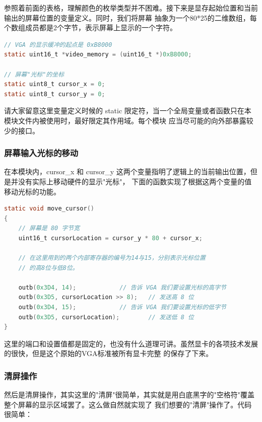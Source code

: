 \par 参照着前面的表格，理解颜色的枚举类型并不困难。接下来是显存起始位置和当前输出的屏幕位置的变量定义。同时，我们将屏幕\allowbreak
抽象为一个80*25的二维数组，每个数组成员都是2个字节，表示屏幕上显示的一个字符。

\begin{lstlisting}[language = C, caption = drivers/console.c]
// VGA 的显示缓冲的起点是 0xB8000
static uint16_t *video_memory = (uint16_t *)0xB8000;

// 屏幕"光标"的坐标
static uint8_t cursor_x = 0;
static uint8_t cursor_y = 0;
\end{lstlisting}

\par 请大家留意这里变量定义时候的 static 限定符，当一个全局变量或者函数只在本模块文件内被使用时，最好限定其作用域。每个模块\allowbreak
应当尽可能的向外部暴露较少的接口。

\subsubsection{屏幕输入光标的移动}

\par 在本模块内，cursor\_x 和 cursor\_y 这两个变量指明了逻辑上的当前输出位置，但是并没有实际上移动硬件的显示"光标"，\allowbreak
下面的函数实现了根据这两个变量的值移动光标的功能。

\begin{lstlisting}[language = C, caption = drivers/console.c]
static void move_cursor()
{
	// 屏幕是 80 字节宽
	uint16_t cursorLocation = cursor_y * 80 + cursor_x;
	
	// 在这里用到的两个内部寄存器的编号为14与15，分别表示光标位置
	// 的高8位与低8位。

	outb(0x3D4, 14); 			// 告诉 VGA 我们要设置光标的高字节
	outb(0x3D5, cursorLocation >> 8); 	// 发送高 8 位
	outb(0x3D4, 15); 			// 告诉 VGA 我们要设置光标的低字节
	outb(0x3D5, cursorLocation);      	// 发送低 8 位
}
\end{lstlisting}

\par 这里的端口和设置值都是固定的，也没有什么道理可讲。虽然显卡的各项技术发展的很快，但是这个原始的VGA标准被所有显卡完整\allowbreak
的保存了下来。

\subsubsection{清屏操作}

\par 然后是清屏操作，其实这里的"清屏"很简单，其实就是用白底黑字的"空格符"覆盖整个屏幕的显示区域罢了。这么做自然就实现了\allowbreak
我们想要的"清屏"操作了。代码很简单：

